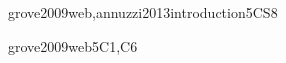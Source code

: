 \begin{syllabus}
\begin{unit}{\PBDIntroduction}{}{grove2009web,annuzzi2013introduction}{5}{CS8}
\begin{topics}%
    \item \PBDIntroductionTopicOverview
    \item \PBDIntroductionTopicProgramming
    \item \PBDIntroductionTopicOverviewOf
    \item \PBDIntroductionTopicProgrammingUnder
\end{topics}
\begin{learningoutcomes}
    \item \PBDIntroductionLODescribeHowDevelopment [\Familiarity]
    \item \PBDIntroductionLOListCharacteristics [\Familiarity]
    \item \PBDIntroductionLOWriteAnd [\Familiarity]
    \item \PBDIntroductionLOListTheDisadvantages [\Familiarity]
\end{learningoutcomes}
\end{unit}



\begin{unit}{\PBDWebPlatforms}{}{grove2009web}{5}{C1,C6}
\begin{topics}%
    \item \PBDWebPlatformsTopicWeb
    \item \PBDWebPlatformsTopicWebPlatform
    \item \PBDWebPlatformsTopicSoftware
    \item \PBDWebPlatformsTopicWebStandards
\end{topics}
\begin{learningoutcomes}
    \item \PBDWebPlatformsLODesignAndSimple [\Familiarity]
    \item \PBDWebPlatformsLODescribeTheTheOn [\Familiarity]
    \item \PBDWebPlatformsLOCompareAndProgramming [\Familiarity]
    \item \PBDWebPlatformsLODescribeTheSoftware [\Familiarity]
    \item \PBDWebPlatformsLODiscussHowImpact [\Familiarity]
    \item \PBDWebPlatformsLOReview [\Familiarity]
\end{learningoutcomes}
\end{unit}



\end{syllabus}
